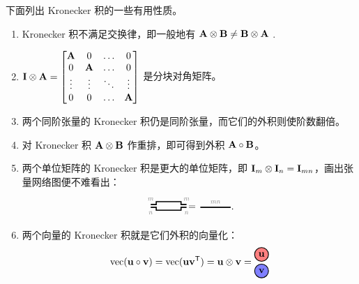 \begin{remark}
下面列出 Kronecker 积的一些有用性质。
\begin{enumerate}
    \item Kronecker 积不满足交换律，即一般地有 $\Ab\kron\Bb \neq \Bb\kron\Ab$%
    . 
    \item
    $
    \Ib\kron\Ab = 
    \begin{bmatrix}
    \Ab & 0 & \dots & 0\\
    0 & \Ab & \dots & 0\\
    \vdots & \vdots & \ddots & \vdots\\
    0 & 0 & \dots & \Ab
    \end{bmatrix}
    $
    是分块对角矩阵。
    \item 两个同阶张量的 Kronecker 积仍是同阶张量，而它们的外积则使阶数翻倍。
    \item 
    对 Kronecker 积 $\Ab\kron\Bb$ 作重排，即可得到外积 $\Ab\outprod\Bb$。
 \item
两个{单位矩阵}的 Kronecker 积是更大的单位矩阵，即 $\Ib_m \kron \Ib_n = \Ib_{mn}$，画出张量网络图便不难看出：
$$
\begin{tikzpicture}[baseline=-0.5ex]
    \tikzset{tensor/.style = {minimum width = 3cm,minimum height = 0.6cm,shape = rounded rectangle,thick,draw=black,inner sep = 0pt}, edge/.style = {thick,line width=.4mm},every loop/.style={}}
    \def\x{0}
    \def\y{0.1}
    \draw[edge](\x-0.1,\y) node [above] {\scalebox{0.7}{\dimcolor{$m$}}}  -- (\x+0.1,\y) -- (\x+0.1,\y+0.1)--(\x+1,\y+0.1) -- (\x+1,\y)-- (\x+1.2,\y) node [above] {\scalebox{0.7}{\dimcolor{$m$}}};
    \draw[edge](\x-0.1,\y-0.1)  node [below] {\scalebox{0.7}{\dimcolor{$n$}}}  -- (\x+0.1,\y-0.1) -- (\x+0.1,\y-0.2)--(\x+1,\y-0.2) -- (\x+1,\y-0.1) --(\x+1.2,\y-0.1)  node [below] {\scalebox{0.7}{\dimcolor{$n$}}} ;
    \node[draw=none] at (\x+1.4,\y-0.1) {\scalebox{1}{\textcolor{black}{$=$}}};
    \draw[edge](\x+1.7,\y-0.1) -- (\x+2.8,\y-0.1) node [midway, above] {\scalebox{0.7}{\dimcolor{$mn$}}} ;
\end{tikzpicture}.
$$
     \item
     两个向量的 Kronecker 积就是它们外积的向量化：
     $$\vectorize(\ub \outprod \vb) = \vectorize(\ub  \vb^\ts) =\ub \kron \vb =  \begin{tikzpicture}[baseline=-0.5ex]
    \tikzset{tensor/.style = {minimum size = 0.5cm,shape = circle,thick,draw=black,inner sep = 0pt}, edge/.style   = {thick,line width=.4mm}}
    \def\x{0}
    \def\y{0}
    \node[tensor,fill=red!50!white] (A) at (\x,\y+0.3){$\ub$};
    \node[tensor,fill=blue!50!white] (B) at (\x,\y-0.3){$\vb$};

\end{tikzpicture}$$
\end{enumerate}
\end{remark}
